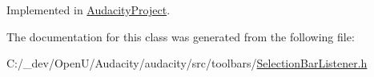 Implemented in \hyperlink{class_audacity_project_a64769c7707980ff5e2df15b5ac8a2c50}{Audacity\+Project}.



The documentation for this class was generated from the following file\+:\begin{DoxyCompactItemize}
\item 
C\+:/\+\_\+dev/\+Open\+U/\+Audacity/audacity/src/toolbars/\hyperlink{_selection_bar_listener_8h}{Selection\+Bar\+Listener.\+h}\end{DoxyCompactItemize}
